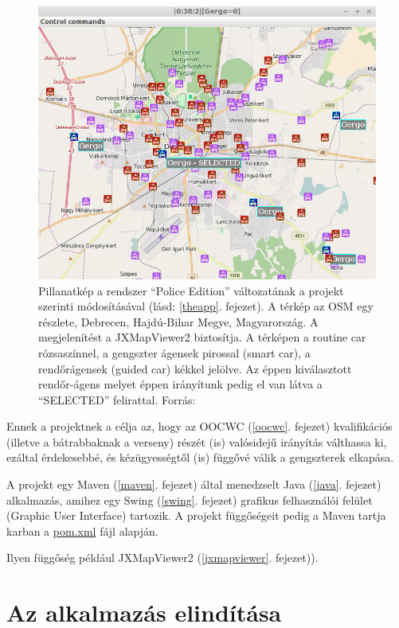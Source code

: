 \documentclass[a4paper,12pt]{report}
\begin{document}
\begin{figure}[ht]
\centerline{
\includegraphics[width=6in]{img/copselected}}
\caption{Pillanatkép a rendszer ``Police Edition'' változatának a projekt szerinti módosításával (lásd: \ref{theapp}. fejezet). A térkép az OSM egy részlete, Debrecen, Hajdú-Bihar Megye, Magyarország. A megjelenítést a JXMapViewer2 \cite{jxmapv} biztosítja. A térképen a routine car rózsaszínnel, a gengszter ágensek pirossal (smart car), a rendőrágensek (guided car) kékkel jelölve. Az éppen kiválasztott rendőr-ágens melyet éppen irányítunk pedig el van látva a ``SELECTED'' felirattal. Forrás: \cite{infocomjournal} 
\label{police}}
\end{figure}

Ennek a projektnek a célja az, hogy az OOCWC (\ref{oocwc}. fejezet) kvalifikációs (illetve a bátrabbaknak a verseny) részét (is) valósidejű irányítás válthassa ki, ezáltal érdekesebbé, és kézügyességtől (is) függővé válik a gengszterek elkapása.

\vspace{2mm}
A projekt egy Maven (\ref{maven}. fejezet) által menedzselt Java (\ref{java}. fejezet) alkalmazás, amihez egy Swing (\ref{swing}. fejezet) grafikus felhasználói felület (Graphic User Interface) tartozik. A projekt függőségeit pedig a Maven tartja karban a \url{pom.xml} fájl alapján. 

\vspace{2mm}
Ilyen függőség például JXMapViewer2 \cite{jxmapv} (\ref{jxmapviewer}. fejezet)).


\section{Az alkalmazás elindítása}
\label{howtorun}
\end{document}
